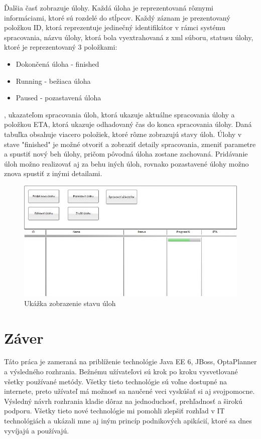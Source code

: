 Ďalšia časť zobrazuje úlohy. Každá úloha je reprezentovaná rôznymi informáciami, ktoré sú rozdelé do stĺpcov. Každý záznam je prezentovaný položkou ID, ktorá reprezentuje jedinečný identifikátor v rámci systému spracovania, názvu úlohy, ktorá bola vyextrahovaná z xml súboru, statusu úlohy, ktoré je reprezentovaný 3 položkami:
\begin{itemize}
\item Dokončená úloha - finished
\item Running - bežiaca úloha
\item Paused - pozastavená úloha
\end{itemize}
, ukazateľom spracovania úloh, ktorá ukazuje aktuálne spracovania úlohy a položkou ETA, ktorá ukazuje odhadovaný čas do konca spracovania úlohy. Daná tabuľka obsahuje viacero položiek, ktoré rôzne zobrazujú stavy úloh. Úlohy v stave "finished" je možné otvoriť a zobraziť detaily spracovania, zmeniť parametre a spustiť nový beh úlohy, pričom pôvodná úloha zostane zachovaná. Pridávanie úloh možno realizovať aj za behu iných úloh, rovnako pozastavené úlohy možno znova spustiť z inými detailami.

\begin{figure}[h]

\begin{center}

\includegraphics[scale=0.8]{Zobrazenie.jpg} 
\caption{Ukážka zobrazenie stavu úloh}
\label{zobrazenie}

\end{center}

\end{figure}





\chapter{Záver}
Táto práca je zameraná na priblíženie technológie Java EE 6, JBoss, OptaPlanner a výsledného rozhrania. Bežnému užívateľovi sú krok po kroku vysvetlované všetky používané metódy. Všetky tieto technológie sú voľne dostupné na internete, preto užívateľ má možnosť sa naučené veci vyskúšať si aj svojpomocne. Výsledný návrh rozhrania kladie dôraz na jednoduchosť, prehľadnosť a širokú podporu. Všetky tieto nové technológie mi pomohli zlepšiť rozhľad v IT technológiách a ukázali mne aj iným  princíp podnikových apikácií, ktoré sa dnes vyvíjajú a používajú.



